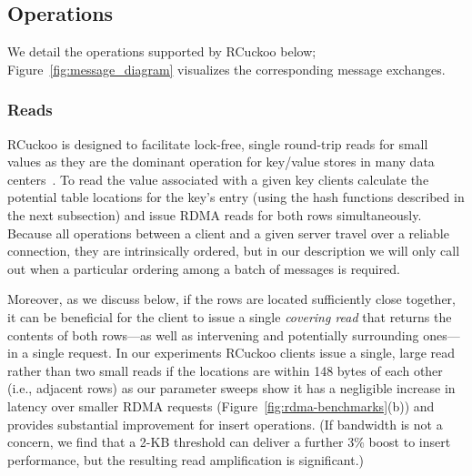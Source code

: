 \subsection{Operations}

We detail the operations supported by RCuckoo below;
Figure~\ref{fig:message_diagram} visualizes the corresponding message
exchanges. 

\subsubsection{Reads} 
\label{sec:reading}


RCuckoo is designed to facilitate lock-free, single round-trip reads
for small values as they are the dominant operation for key/value
stores in many data centers~\cite{rocks-db-workload,facebook-memcached}. To
read the value associated with a given key clients calculate the
potential table locations for the key's entry (using the hash
functions described in the next subsection) and issue RDMA reads for
both rows simultaneously.  Because all operations between a client and
a given server travel over a reliable connection, they are
intrinsically ordered, but in our description we will only call out
when a particular ordering among a batch of messages is required.


Moreover, as we discuss below, if the rows are
located sufficiently close together, it can be beneficial for the
client to issue a single \emph{covering read} that returns the
contents of both rows---as well as intervening and potentially
surrounding ones---in a single request.
In our experiments RCuckoo clients issue a single, large read rather than two small reads if the locations are within 148 bytes of each other (i.e., adjacent rows)
as our parameter sweeps show it has a negligible
increase in latency over smaller RDMA requests
(Figure~\ref{fig:rdma-benchmarks}(b)) and provides substantial
improvement for insert operations.  (If bandwidth is not a concern, we
find that a 2-KB threshold can deliver a further 3\% boost to insert
performance, but the resulting read amplification is significant.)



